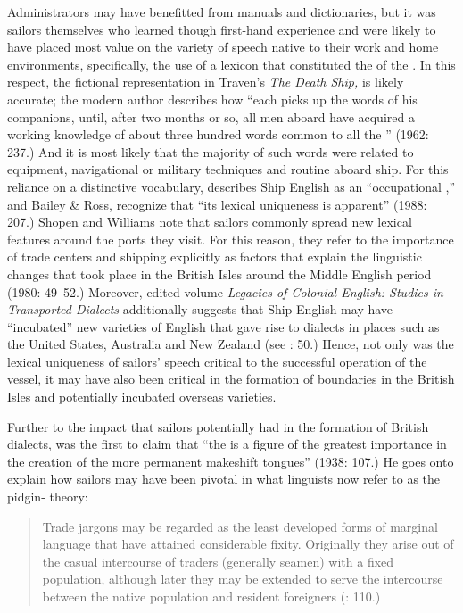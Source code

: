 Administrators may have benefitted from manuals and dictionaries, but it was sailors themselves who learned though first-hand experience and were likely to have placed most value on the variety of speech native to their work and home environments, specifically, the use of a lexicon that constituted the  of the . In this respect, the fictional representation in Traven’s \textit{The Death Ship,} is likely accurate; the modern author describes how “each  picks up the words of his companions, until, after two months or so, all men aboard have acquired a working knowledge of about three hundred words common to all the ” (1962: 237.) And it is most likely that the majority of such words were related to equipment, navigational or military techniques and routine aboard ship. For this reliance on a distinctive vocabulary, \citet{Hancock1986} describes Ship English as an “occupational ,” and Bailey \& Ross, recognize that “its lexical uniqueness is apparent” (1988: 207.) Shopen and Williams note that sailors commonly spread new lexical features around the ports they visit. For this reason, they refer to the importance of trade centers and shipping explicitly as factors that explain the linguistic changes that took place in the British Isles around the Middle English period (1980: 49--52.) Moreover,  edited volume \textit{Legacies of Colonial English: Studies in Transported Dialects} additionally suggests that Ship English may have “incubated” new varieties of English that gave rise to dialects in places such as the United States, Australia and New Zealand (see \citealt{Hickey2004}: 50.) Hence, not only was the lexical uniqueness of sailors’ speech critical to the successful operation of the vessel, it may have also been critical in the formation of  boundaries in the British Isles and potentially incubated overseas varieties.

Further to the impact that sailors potentially had in the formation of British dialects, \citet{Reinecke1938} was the first to claim that “the  is a figure of the greatest importance in the creation of the more permanent makeshift tongues” (1938: 107.) He goes onto explain how sailors may have been pivotal in what linguists now refer to as the pidgin- theory:

\begin{quotation}
Trade jargons may be regarded as the least developed forms of marginal language that have attained considerable fixity. Originally they arise out of the casual intercourse of traders (generally seamen) with a fixed population, although later they may be extended to serve the intercourse between the native population and resident foreigners (\citealt{Reinecke1938}: 110.) \end{quotation}

